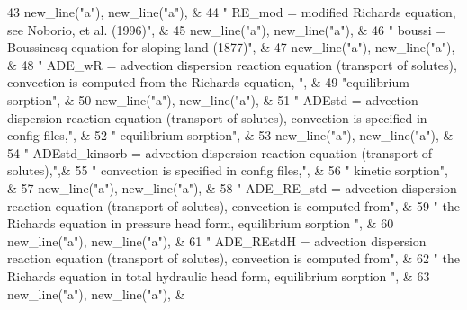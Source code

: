 \begin{DoxyCode}
43 \textcolor{comment}{        new\_line(}\textcolor{stringliteral}{"a"}),  new\_line(\textcolor{stringliteral}{"a"}), &
44         \textcolor{stringliteral}{"   RE\_mod = modified Richards equation, see Noborio, et al. (1996)"}, &
45         new\_line(\textcolor{stringliteral}{"a"}),  new\_line(\textcolor{stringliteral}{"a"}), &
46         \textcolor{stringliteral}{"   boussi = Boussinesq equation for sloping land (1877)"}, &
47         new\_line(\textcolor{stringliteral}{"a"}),  new\_line(\textcolor{stringliteral}{"a"}), &
48         \textcolor{stringliteral}{"   ADE\_wR = advection dispersion reaction equation (transport of solutes), convection is computed
       from the Richards equation, "}\textcolor{comment}{, &}
49 \textcolor{comment}{        }\textcolor{stringliteral}{"equilibrium sorption"}, &
50         new\_line(\textcolor{stringliteral}{"a"}),  new\_line(\textcolor{stringliteral}{"a"}), &
51         \textcolor{stringliteral}{"   ADEstd = advection dispersion reaction equation (transport of solutes),  convection is
       specified in config files,"}\textcolor{comment}{, &}
52 \textcolor{comment}{        }\textcolor{stringliteral}{" equilibrium sorption"}, &
53         new\_line(\textcolor{stringliteral}{"a"}),  new\_line(\textcolor{stringliteral}{"a"}), &
54         \textcolor{stringliteral}{"   ADEstd\_kinsorb = advection dispersion reaction equation (transport of solutes),"}\textcolor{comment}{,&}
55 \textcolor{comment}{        }\textcolor{stringliteral}{" convection is specified in config files,"}, &
56         \textcolor{stringliteral}{" kinetic sorption"}, &
57         new\_line(\textcolor{stringliteral}{"a"}),  new\_line(\textcolor{stringliteral}{"a"}), &
58         \textcolor{stringliteral}{"   ADE\_RE\_std = advection dispersion reaction equation (transport of solutes), convection is
       computed from"}\textcolor{comment}{, &}
59 \textcolor{comment}{        }\textcolor{stringliteral}{" the Richards equation in pressure head form, equilibrium sorption "}, \textcolor{comment}{&}
60 \textcolor{comment}{        new\_line(}\textcolor{stringliteral}{"a"}),  new\_line(\textcolor{stringliteral}{"a"}), &
61         \textcolor{stringliteral}{"   ADE\_REstdH = advection dispersion reaction equation (transport of solutes), convection is
       computed from"}\textcolor{comment}{, &}
62 \textcolor{comment}{        }\textcolor{stringliteral}{" the Richards equation in total hydraulic head form, equilibrium sorption "}\textcolor{comment}{, &}
63 \textcolor{comment}{                new\_line(}\textcolor{stringliteral}{"a"}),  new\_line(\textcolor{stringliteral}{"a"}), &

\end{DoxyCode}
